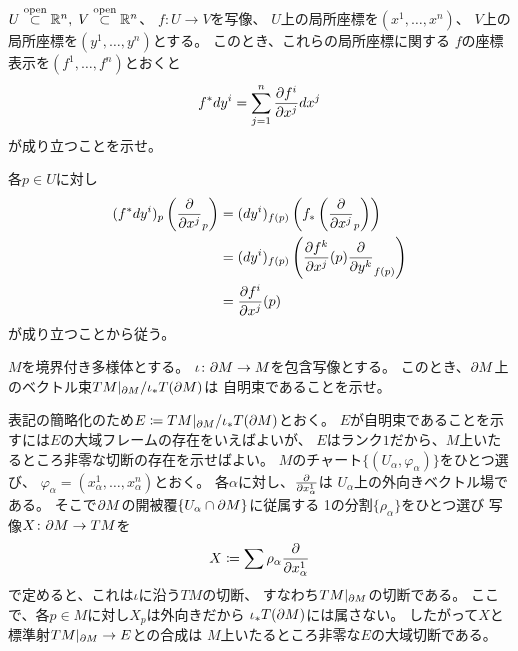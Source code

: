\documentclass[report]{jlreq}
\begin{document}
\begin{problem}[幾何学III 問1.2.11]
    $U \stackrel{\text{open}}{\subset} \mathbb{R}^n, \; V \stackrel{\text{open}}{\subset} \mathbb{R}^n$、
    $f \colon U \to V$を{\smooth}写像、
    $U$上の局所座標を$(x^1, \dots, x^n)$、
    $V$上の局所座標を$(y^1, \dots, y^n)$とする。
    このとき、これらの局所座標に関する
    $f$の座標表示を$(f^1, \dots, f^n)$とおくと
    \begin{equation}
        f^* dy^i = \sum_{j = 1}^n \deldel[f^i]{x^j} dx^j
    \end{equation}
    が成り立つことを示せ。
\end{problem}

\begin{answer}
    各$p \in U$に対し
    \begin{alignat}{1}
        (f^* dy^i)_p \left( \deldel{x^j}_p \right)
            &= (dy^i)_{f(p)} \left(
                f_* \left( \deldel{x^j}_p \right)
            \right) \\
            &= (dy^i)_{f(p)} \left(
                \deldel[f^k]{x^j}(p) \deldel{y^k}_{f(p)}
            \right) \\
            &= \deldel[f^i]{x^j}(p)
    \end{alignat}
    が成り立つことから従う。
\end{answer}

\begin{problem}[幾何学III 問1.3.9]
    $M$を境界付き多様体とする。
    $\iota \colon \partial M \to M$を包含写像とする。
    このとき、$\partial M$上のベクトル束$TM|_{\partial M} / \iota_* T(\partial M)$は
    自明束であることを示せ。
\end{problem}

\begin{answer}
    表記の簡略化のため$E \coloneqq TM|_{\partial M} / \iota_* T(\partial M)$とおく。
    $E$が自明束であることを示すには$E$の大域フレームの存在をいえばよいが、
    $E$はランク$1$だから、$M$上いたるところ非零な切断の存在を示せばよい。
    $M$のチャート$\{ (U_\alpha, \varphi_\alpha) \}$をひとつ選び、
    $\varphi_\alpha = (x_\alpha^1, \dots, x_\alpha^n)$とおく。
    各$\alpha$に対し、$\deldel{x_\alpha^1}$は
    $U_\alpha$上の外向きベクトル場である。
    そこで$\partial M$の開被覆$\{ U_\alpha \cap \partial M \}$に従属する
    1の分割$\{ \rho_\alpha \}$をひとつ選び
    写像$X \colon \partial M \to TM$を
    \begin{equation}
        X \coloneqq \sum \rho_\alpha \deldel{x_\alpha^1}
    \end{equation}
    で定めると、これは$\iota$に沿う$TM$の切断、
    すなわち$TM|_{\partial M}$の切断である。
    ここで、各$p \in M$に対し$X_p$は外向きだから
    $\iota_* T(\partial M)$には属さない。
    したがって$X$と標準射$TM|_{\partial M} \to E$との合成は
    $M$上いたるところ非零な$E$の大域切断である。
\end{answer}
\end{document}
